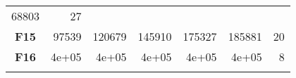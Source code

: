 \documentclass[12pt,a4paper]{article}
\begin{document}
\begin{longtable}[c]{@{}crrrrrr@{}}
\begin{minipage}[t]{0.11\columnwidth}
68803
\strut\end{minipage} &
\begin{minipage}[t]{0.07\columnwidth}\raggedleft\strut
27
\strut\end{minipage}\tabularnewline
\begin{minipage}[t]{0.11\columnwidth}\centering\strut
\textbf{F15}
\strut\end{minipage} &
\begin{minipage}[t]{0.08\columnwidth}\raggedleft\strut
97539
\strut\end{minipage} &
\begin{minipage}[t]{0.08\columnwidth}\raggedleft\strut
120679
\strut\end{minipage} &
\begin{minipage}[t]{0.09\columnwidth}\raggedleft\strut
145910
\strut\end{minipage} &
\begin{minipage}[t]{0.10\columnwidth}\raggedleft\strut
175327
\strut\end{minipage} &
\begin{minipage}[t]{0.11\columnwidth}\raggedleft\strut
185881
\strut\end{minipage} &
\begin{minipage}[t]{0.07\columnwidth}\raggedleft\strut
20
\strut\end{minipage}\tabularnewline
\begin{minipage}[t]{0.11\columnwidth}\centering\strut
\textbf{F16}
\strut\end{minipage} &
\begin{minipage}[t]{0.08\columnwidth}\raggedleft\strut
4e+05
\strut\end{minipage} &
\begin{minipage}[t]{0.08\columnwidth}\raggedleft\strut
4e+05
\strut\end{minipage} &
\begin{minipage}[t]{0.09\columnwidth}\raggedleft\strut
4e+05
\strut\end{minipage} &
\begin{minipage}[t]{0.10\columnwidth}\raggedleft\strut
4e+05
\strut\end{minipage} &
\begin{minipage}[t]{0.11\columnwidth}\raggedleft\strut
4e+05
\strut\end{minipage} &
\begin{minipage}[t]{0.07\columnwidth}\raggedleft\strut
8
\strut\end{minipage}\tabularnewline
\begin{minipage}[t]{0.11\columnwidth}\centering\strut

\end{minipage}
\end{longtable}
\end{document}
